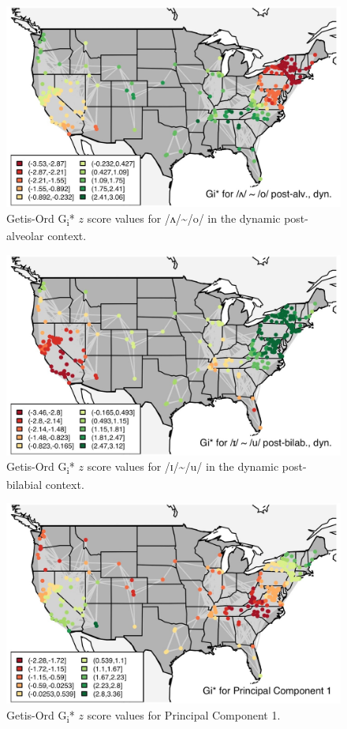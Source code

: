 \documentclass[output=paper]{LSP/langsci}
\begin{document}
\begin{figure}
\includegraphics[width=\textwidth]{illustrations/kend_frid_fig4}
\caption{Getis-Ord G\textsubscript{i}* $z$ score values for /ʌ/{\textasciitilde}/o/ in the dynamic post-alveolar context.}
\label{fig:4}
\end{figure}

\begin{figure}
\includegraphics[width=\textwidth]{illustrations/kend_frid_fig5}
\caption{Getis-Ord G\textsubscript{i}* $z$ score values for /ɪ/{\textasciitilde}/u/ in the dynamic post-bilabial context.}
\label{fig:5}
\end{figure}

\begin{figure}
\includegraphics[width=\textwidth]{illustrations/kend_frid_fig6}
\caption{Getis-Ord G\textsubscript{i}* $z$ score values for Principal Component 1.}
\label{fig:6}
\end{figure}
\end{document}
